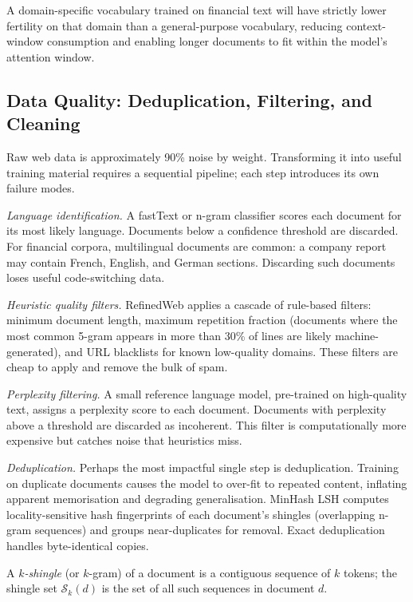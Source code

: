 \begin{context}
A domain-specific vocabulary trained on financial text will have strictly
lower fertility on that domain than a general-purpose vocabulary, reducing
context-window consumption and enabling longer documents to fit within the
model's attention window.

\subsection{Data Quality: Deduplication, Filtering, and Cleaning}
\label{subsec:data-quality}

Raw web data is approximately 90\% noise by weight.  Transforming it into
useful training material requires a sequential pipeline; each step introduces
its own failure modes.

\emph{Language identification.}  A fastText or n-gram classifier scores each
document for its most likely language.  Documents below a confidence threshold
are discarded.  For financial corpora, multilingual documents are common:
a company report may contain French, English, and German sections.  Discarding
such documents loses useful code-switching data.

\emph{Heuristic quality filters.}  RefinedWeb \cite{penedo2023refinedweb} applies
a cascade of rule-based filters: minimum document length, maximum repetition
fraction (documents where the most common 5-gram appears in more than 30\% of
lines are likely machine-generated), and URL blacklists for known low-quality
domains.  These filters are cheap to apply and remove the bulk of spam.

\emph{Perplexity filtering.}  A small reference language model, pre-trained on
high-quality text, assigns a perplexity score to each document.  Documents with
perplexity above a threshold are discarded as incoherent.  This filter is
computationally more expensive but catches noise that heuristics miss.

\emph{Deduplication.}  Perhaps the most impactful single step is deduplication.
Training on duplicate documents causes the model to over-fit to repeated content,
inflating apparent memorisation and degrading generalisation.  MinHash LSH
computes locality-sensitive hash fingerprints of each document's shingles (overlapping
n-gram sequences) and groups near-duplicates for removal.  Exact deduplication
handles byte-identical copies.

A \emph{$k$-shingle} (or $k$-gram) of a document is a contiguous sequence of $k$ tokens; the shingle set $\mathcal{S}_k(d)$ is the set of all such sequences in document $d$.


\end{context}
